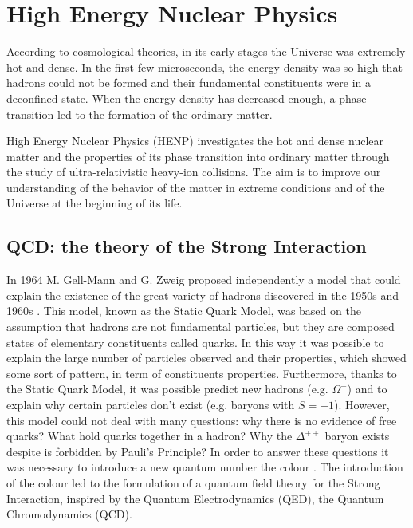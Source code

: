 %
\chapter{High Energy Nuclear Physics}
\label{sec:1}


According to cosmological theories, in its early stages the Universe was extremely hot and dense.
In the first few microseconds, the energy density was so high that hadrons could not be formed and
their fundamental constituents were in a deconfined state. When the energy density has decreased
enough, a phase transition led to the formation of the ordinary matter. 

High Energy Nuclear Physics (HENP) investigates the hot and dense nuclear matter and the properties
of its phase transition into ordinary matter through the study of ultra-relativistic heavy-ion collisions. 
The aim is to improve our understanding of the behavior of the matter in extreme conditions and of the
Universe at the beginning of its life.

\section{QCD: the theory of the Strong Interaction}
\label{sec:1.1}

In 1964 M. Gell-Mann and G. Zweig proposed independently a model that could explain the existence of
the great variety of hadrons discovered in the 1950s and 1960s 
\cite{gellmann, zweig1, zweig2}. 
This model, known as the Static Quark Model, was based on the assumption that hadrons are not
fundamental particles, but they are composed states of elementary constituents called quarks.
In this way it was possible to explain the large number of particles observed and their properties,
which showed some sort of pattern, in term of constituents properties.
Furthermore, thanks to the Static Quark Model, it was possible predict new hadrons (e.g. 
$\Omega^{-}\xspace$) and to explain why certain particles don't exist (e.g. baryons with $S=+1$).
However, this model could not deal with many questions: why there is no evidence of free quarks?
What hold quarks together in a hadron? Why the $\Delta^{++}$ baryon exists despite is forbidden
by Pauli's Principle?
In order to answer these questions it was necessary to introduce a new quantum number the colour
\cite{fritzsch-gellmann}. The introduction of the colour led to the formulation of a quantum field theory
for the Strong Interaction, inspired by the Quantum Electrodynamics (QED), the Quantum Chromodynamics
(QCD).

